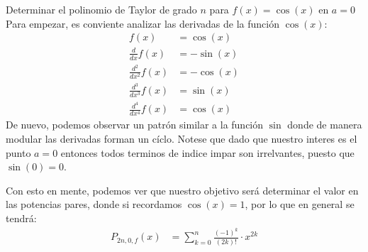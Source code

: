 \documentclass[12pt,a4paper,oneside]{memoir}
\begin{document}
\begin{problem}
    Determinar el polinomio de Taylor de grado $n$ para $f(x) = \cos(x)$ en $a = 0$\\

    Para empezar, es conviente analizar las derivadas de la función $\cos(x)$:
    \begin{align*}
        f(x) &= \cos(x)\\
        \frac{d}{dx} f(x) &= -\sin(x)\\
        \frac{d^2}{dx^2} f(x) &= -\cos(x)\\
        \frac{d^3}{dx^3} f(x) &= \sin(x)\\
        \frac{d^4}{dx^4} f(x) &= \cos(x)
    \end{align*}
    De nuevo, podemos observar un patrón similar a la función $\sin$ donde de manera modular las derivadas forman un cíclo. Notese que dado que nuestro interes es el punto $a = 0$ entonces todos terminos de indice impar son irrelvantes, puesto que $\sin(0) = 0$.

    Con esto en mente, podemos ver que nuestro objetivo será determinar el valor en las potencias pares, donde si recordamos $\cos(x) = 1$, por lo que en general se tendrá:
    \begin{align*}
        P_{2n, 0, f}(x) &= \sum_{k = 0}^n \frac{(-1)^k}{(2k)!} \cdot x^{2k}
    \end{align*}
\end{problem}
\end{document}
